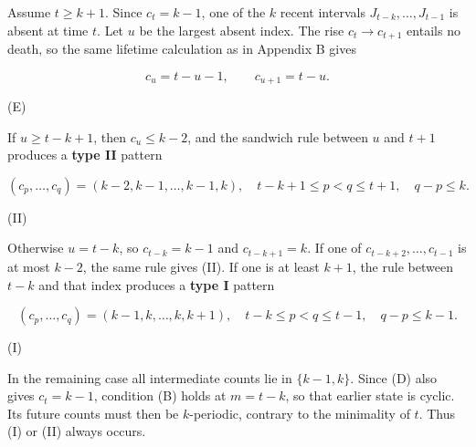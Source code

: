 \documentclass[11pt,a4paper]{article}
\begin{document}
Assume $t\ge k+1$. Since $c_t=k-1$, one of the $k$ recent intervals $J_{t-k},\ldots,J_{t-1}$ is absent at time $t$. Let $u$ be the largest absent index. The rise $c_t\to c_{t+1}$ entails no death, so the same lifetime calculation as in Appendix B gives

\[
c_u=t-u-1,\qquad c_{u+1}=t-u.
\]

(E)

If $u\ge t-k+1$, then $c_u\le k-2$, and the sandwich rule between $u$ and $t+1$ produces a \textbf{type II} pattern

\[
(c_p,\ldots,c_q)=(k-2,k-1,\ldots,k-1,k),\quad
t-k+1\le p<q\le t+1,\quad q-p\le k.
\]

(II)

Otherwise $u=t-k$, so $c_{t-k}=k-1$ and $c_{t-k+1}=k$. If one of $c_{t-k+2},\ldots,c_{t-1}$ is at most $k-2$, the same rule gives (II). If one is at least $k+1$, the rule between $t-k$ and that index produces a \textbf{type I} pattern

\[
(c_p,\ldots,c_q)=(k-1,k,\ldots,k,k+1),\quad
t-k\le p<q\le t-1,\quad q-p\le k-1.
\]

(I)

In the remaining case all intermediate counts lie in $\{k-1,k\}$. Since (D) also gives $c_t=k-1$, condition (B) holds at $m=t-k$, so that earlier state is cyclic. Its future counts must then be $k$-periodic, contrary to the minimality of $t$. Thus (I) or (II) always occurs.
\end{document}
